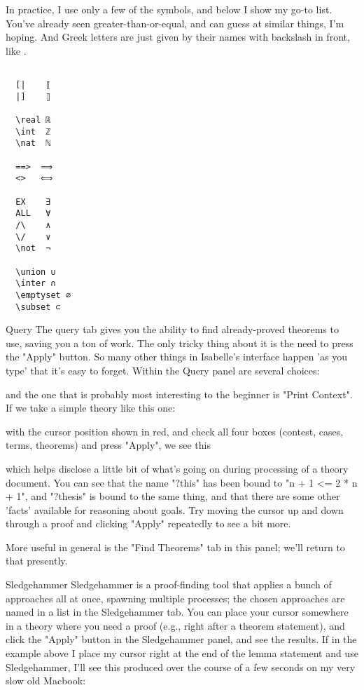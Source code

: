 In practice, I use only a few of the symbols, and below I show my go-to list. You've already seen greater-than-or-equal, and can guess at similar things, I'm hoping. And Greek letters are just given by their names with backslash in front, like \isi{\beta}.

\begin{verbatim}

  [|    ⟦
  |]    ⟧

  \real ℝ
  \int  ℤ
  \nat  ℕ

  ==>  ⟹  
  <>   ⟺

  EX    ∃
  ALL   ∀
  /\    ∧
  \/    ∨
  \not  ¬

  \union ∪
  \inter ∩
  \emptyset ∅
  \subset ⊂
\end{verbatim}

Query
The query tab gives you the ability to find already-proved theorems to use, saving you a ton of work. The only tricky thing about it is the need to press the "Apply" button. So many other things in Isabelle's interface happen 'as you type' that it's easy to forget. Within the Query panel are several choices:


and the one that is probably most interesting to the beginner is "Print Context". If we take a simple theory like this one:

with the cursor position shown in red, and check all four boxes (contest, cases, terms, theorems) and press "Apply", we see this

which helps disclose a little bit of what's going on during processing of a theory document. You can see that the name "?this" has been bound to "n + 1 <= 2 * n + 1", and "?thesis" is bound to the same thing, and that there are some other 'facts' available for reasoning about goals. Try moving the cursor up and down through a proof and clicking "Apply" repeatedly to see a bit more. 

More useful in general is the "Find Theorems" tab in this panel; we'll return to that presently. 

Sledgehammer
Sledgehammer is a proof-finding tool that applies a bunch of approaches all at once, spawning multiple processes; the chosen approaches are named in a list in the Sledgehammer tab. You can place your cursor somewhere in a theory where you need a proof (e.g., right after a theorem statement), and click the "Apply" button in the Sledgehammer panel, and see the results. If in the example above I place my cursor right at the end of the lemma statement and use Sledgehammer, I'll see this produced over the course of a few seconds on my very slow old Macbook:


